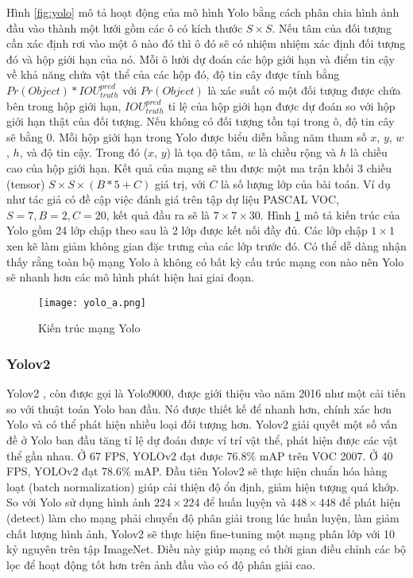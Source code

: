 \documentclass[../the.tex]{subfiles}
\begin{document}
{\fontsize{13}{12} \selectfont
Hình \ref{fig:yolo} mô tả hoạt động của mô hình Yolo bằng cách phân chia hình ảnh đầu vào thành một lưới gồm các ô có kích thước
$S \times S$. Nếu tâm của đối tượng cần xác định rơi vào một ô nào đó thì ô đó sẽ có nhiệm nhiệm xác định đối tượng đó và hộp giới hạn của nó.
Mỗi ô lưới dự đoán các hộp giới hạn và điểm tin cậy về khả năng chứa vật thể của các hộp đó, độ tin cây được tính bằng $Pr(Object) * IOU^{pred}_{truth}$ \cite{redmon2016look}
với $Pr(Object)$ là xác suất có một đối tượng được chứa bên trong hộp giới hạn, $IOU^{pred}_{truth}$ tỉ lệ của hộp giới hạn được dự đoán so với hộp giới hạn thật của đối tượng.
Nếu không có đối tượng tồn tại trong ô, độ tin cây sẽ bằng 0. Mỗi hộp giới hạn trong Yolo được biểu diễn bằng năm tham số
$x$, $y$, $w$, $h$, và độ tin cậy. Trong đó ($x$, $y$) là tọa độ tâm, $w$ là chiều rộng và $h$ là chiều cao của hộp giới hạn.
Kết quả của mạng sẽ thu được một ma trận khối 3 chiều (tensor)  $S \times S \times (B * 5 + C)$ giá trị, với
$C$ là số lượng lớp của bài toán. Ví dụ như tác giả có đề cập việc đánh giá trên tập dự liệu PASCAL VOC, $S = 7, B = 2, C = 20$, kết quả đầu ra sẽ là $7 \times 7 \times 30$.
Hình \ref{fig:mangyolo} mô tả kiến trúc của Yolo gồm 24 lớp chập theo sau là 2 lớp được kết nối đầy đủ. Các lớp chập $1 \times 1$ xen kẽ làm giảm không gian đặc trưng của các lớp trước đó.
Có thể dễ dàng nhận thấy rằng toàn bộ mạng Yolo à không có bất kỳ cấu trúc mạng con nào nên Yolo sẽ nhanh hơn các mô hình phát hiện hai giai đoạn.
}

\begin{figure}[H]
	\centering
	\texttt{[image: yolo\_a.png]}
	\caption{Kiến trúc mạng Yolo}
	\label{fig:mangyolo}
\end{figure}
\bigskip

\subsubsection{Yolov2}
{\fontsize{13}{12} \selectfont
	Yolov2 \cite{redmon2016yolo9000}, còn được gọi là Yolo9000, được giới thiệu vào năm 2016 như một cải tiến so với thuật toán Yolo ban đầu. Nó được thiết kế để nhanh hơn, chính xác hơn Yolo và có thể phát hiện nhiều loại đối tượng hơn.
	Yolov2 giải quyết một số vấn đề ở Yolo ban đầu tăng tỉ lệ dự đoán được ví trí vật thể, phát hiện được các vật thể gần nhau.
	Ở 67 FPS, YOLOv2 đạt được 76.8\% mAP trên VOC 2007. Ở 40 FPS, YOLOv2 đạt 78.6\% mAP.
	Đầu tiên Yolov2 sẽ thực hiện chuẩn hóa hàng loạt (batch normalization) giúp cải thiện độ ổn định, giảm hiện tượng quá khớp. So với Yolo sử dụng hình ảnh $224 \times 224$ để huấn luyện và $448 \times 448$
	để phát hiện (detect)  làm cho mạng phải chuyển độ phân giải trong lúc huấn luyện, làm giảm chất lượng hình ảnh, Yolov2 sẽ thực hiện fine-tuning một mạng phân lớp với 10 kỷ nguyên trên tập ImageNet.
	Điều này giúp mạng có thời gian điều chỉnh các bộ lọc để hoạt động tốt hơn trên ảnh đầu vào có độ phân giải cao.
}
\end{document}
